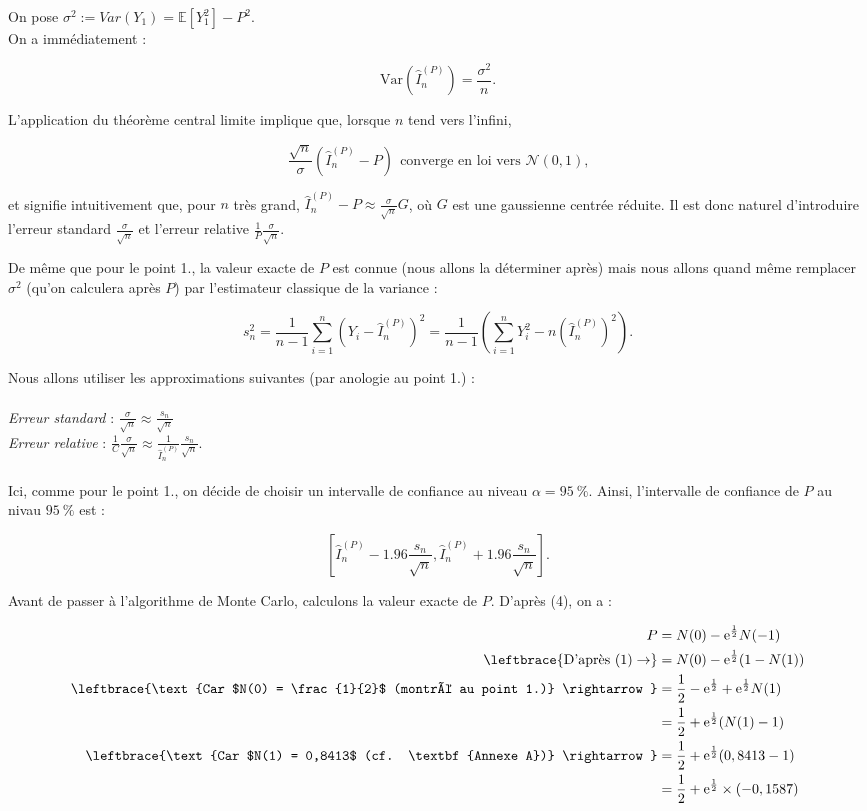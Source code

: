 \documentclass{article}
\theoremstyle{exostyle}
\newenvironment{questions}{
\begin{enumerate}[\hspace{12pt} 1.]}{\end{enumerate}}
\begin{document}
\begin{questions}
On pose $\sigma^{2} := Var(Y_{1}) = \mathbb{E}\left[ Y_{1}^{2} \right] - P^{2}$.\\
On a immédiatement :

\[\text{Var}(\hat{I}_{n}^{(P)}) = \frac{\sigma^{2}}{n}.\]

L'application du théorème central limite implique que, lorsque $n$ tend vers l'infini, 

\[\frac{\sqrt{n}}{\sigma}(\hat{I}_{n}^{(P)} - P) \ \ \text{converge en loi vers $\mathcal{N}(0,1)$,}\]

et signifie intuitivement que, pour $n$ très grand, $\hat{I}_{n}^{(P)} - P \approx \frac{\sigma}{\sqrt{n}}G$, où $G$ est une gaussienne centrée réduite. Il est donc naturel d'introduire l'erreur standard $\frac{\sigma}{\sqrt{n}}$ et l'erreur relative $\frac{1}{P}\frac{\sigma}{\sqrt{n}}$.

De même que pour le point 1., la valeur exacte de $P$ est connue (nous allons la déterminer après) mais nous allons quand même remplacer $\sigma^{2}$ (qu'on calculera après $P$) par l'estimateur classique de la variance : 

\[s_{n}^{2} = \frac{1}{n-1} \sum_{i=1}^{n} \left( Y_{i} - \hat{I}_{n}^{(P)} \right)^{2} = \frac{1}{n-1} \left( \sum_{i=1}^{n} Y_{i}^{2} - n(\hat{I}_{n}^{(P)})^{2} \right).\]

Nous allons utiliser les approximations suivantes (par anologie au point 1.) :\\
\\
\textit{Erreur standard} : $\frac{\sigma}{\sqrt{n}} \approx \frac{s_{n}}{\sqrt{n}}$\\
\textit{Erreur relative} : $\frac{1}{C}\frac{\sigma}{\sqrt{n}} \approx \frac{1}{\hat{I}_{n}^{(P)}}\frac{s_{n}}{\sqrt{n}}$.\\
\\

Ici, comme pour le point 1., on décide de choisir un intervalle de confiance au niveau $\alpha = 95 \ \%$. Ainsi, l'intervalle de confiance de $P$ au nivau $95 \ \%$ est :

\[ \left[ \hat{I}_{n}^{(P)} - 1.96 \frac{s_{n}}{\sqrt{n}}, \hat{I}_{n}^{(P)} + 1.96 \frac{s_{n}}{\sqrt{n}} \right].\]

Avant de passer à l'algorithme de Monte Carlo, calculons la valeur exacte de $P$. D'après (4), on a : 

\begin{align*}
    P &= N(0) - \text{e}^{\frac{1}{2}} N(-1)\\
    \leftbrace{\text{D'après (1)} \rightarrow} &= N(0) - \text{e}^{\frac{1}{2}} (1-N(1))\\
    \leftbrace{\text{Car $N(0) = \frac{1}{2}$ (montré au point 1.)} \rightarrow} &= \frac{1}{2} - \text{e}^{\frac{1}{2}} + \text{e}^{\frac{1}{2}}N(1)\\
    &= \frac{1}{2} + \text{e}^{\frac{1}{2}} (N(1)-1)\\
   \leftbrace{\text{Car $N(1) = 0,8413$ (cf. \textbf{Annexe A})} \rightarrow} &= \frac{1}{2} + \text{e}^{\frac{1}{2}} (0,8413-1)\\
   &= \frac{1}{2} + \text{e}^{\frac{1}{2}} \times (-0,1587)
\end{align*}


\end{questions}
\end{document}
